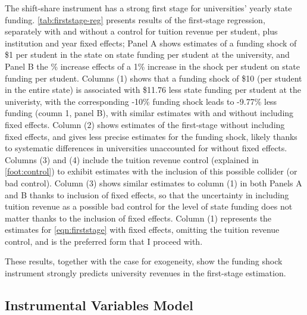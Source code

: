 The shift-share instrument has a strong first stage for universities' yearly state funding.
\autoref{tab:firststage-reg} presents results of the first-stage regression, separately with and without a control for tuition revenue per student, plus institution and year fixed effects;
Panel A shows estimates of a funding shock of \$1 per student in the state on state funding per student at the university, and Panel B the \% increase effects of a 1\% increase in the shock per student on state funding per student.
Columns (1) shows that a funding shock of \$10 (per student in the entire state) is associated with \$11.76 less state funding per student at the univeristy, with the corresponding -10\% funding shock leads to -9.77\%
less funding (coumn 1, panel B), with similar estimates with and without including fixed effects.
Column (2) shows estimates of the first-stage without including fixed effects, and gives less precise estimates for the funding shock, likely thanks to systematic differences in universities unaccounted for without fixed effects.
Columns (3) and (4) include the tuition revenue control (explained in \autoref{foot:control}) to exhibit estimates with the inclusion of this possible collider (or bad control).
Column (3) shows similar estimates to column (1) in both Panels A and B thanks to inclusion of fixed effects, so that the uncertainty in including tuition revenue as a possible bad control for the level of state funding does not matter thanks to the inclusion of fixed effects.
Column (1) represents the estimates for \autoref{eqn:firststage} with fixed effects, omitting the tuition revenue control, and is the preferred form that I proceed with.

These results, together with the case for exogeneity, show the funding shock instrument strongly predicts university revenues in the first-stage estimation.


\subsection{Instrumental Variables Model}
\label{sec:iv-model-uni}

